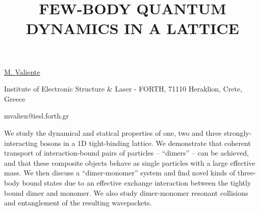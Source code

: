 \title{FEW-BODY QUANTUM DYNAMICS IN A LATTICE}

\underline{M. Valiente} 

{\normalsize{\vspace{-4mm}
Institute of Electronic Structure \& Laser - FORTH, 71110 Heraklion, Crete, Greece%

\email mvalien@iesl.forth.gr}}

We study the dynamical and statical properties of one, two and
three strongly-interacting bosons in a 1D tight-binding lattice.
We demonstrate that coherent transport of interaction-bound pairs
of particles -- ``dimers'' -- can be achieved, and that these composite
objects behave as single particles with a large effective mass.
We then discuss a ``dimer-monomer'' system and find novel kinds of
three-body bound states due to an effective exchange interaction
between the tightly bound dimer and monomer. We also study
dimer-monomer resonant collisions and entanglement of the
resulting wavepackets.

\vspace{\baselineskip}